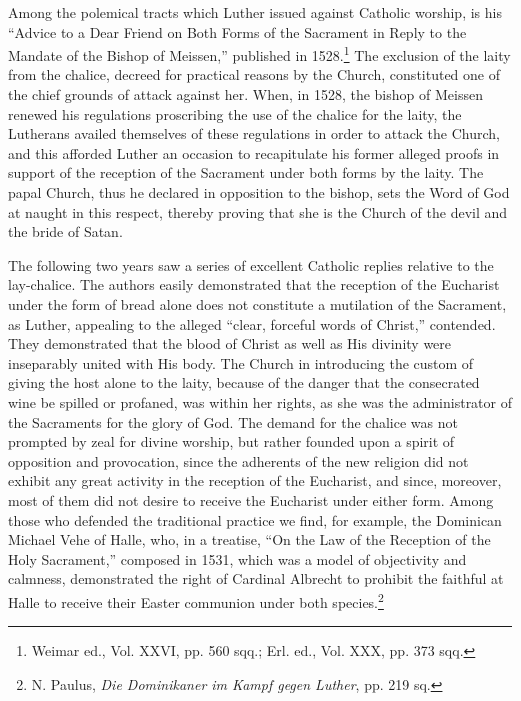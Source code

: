 Among the polemical tracts which Luther issued against Catholic
worship, is his “Advice to a Dear Friend on Both Forms of the Sacrament
in Reply to the Mandate of the Bishop of Meissen,” published in
1528.\footnote{Weimar ed., Vol. XXVI, pp. 560 sqq.; Erl. ed., Vol. XXX, pp. 373 sqq.}
The exclusion of the laity from the chalice, decreed for practical
reasons by the Church, constituted one of the chief grounds of
attack against her. When, in 1528, the bishop of Meissen renewed his
regulations proscribing the use of the chalice for the laity, the Lutherans
availed themselves of these regulations in order to attack the
Church, and this afforded Luther an occasion to recapitulate his former
alleged proofs in support of the reception of the Sacrament under
both forms by the laity. The papal Church, thus he declared in opposition
to the bishop, sets the Word of God at naught in this respect,
thereby proving that she is the Church of the devil and the bride of
Satan.

The following two years saw a series of excellent Catholic replies
relative to the lay-chalice. The authors easily demonstrated that the
reception of the Eucharist under the form of bread alone does not
constitute a mutilation of the Sacrament, as Luther, appealing to the
alleged “clear, forceful words of Christ,” contended. They demonstrated
that the blood of Christ as well as His divinity were inseparably
united with His body. The Church in introducing the custom of
giving the host alone to the laity, because of the danger that the consecrated
wine be spilled or profaned, was within her rights, as she was
the administrator of the Sacraments for the glory of God. The demand for
the chalice was not prompted by zeal for divine worship,
but rather founded upon a spirit of opposition and provocation, since
the adherents of the new religion did not exhibit any great activity in
the reception of the Eucharist, and since, moreover, most of them did
not desire to receive the Eucharist under either form. Among those
who defended the traditional practice we find, for example, the Dominican
Michael Vehe of Halle, who, in a treatise, “On the Law of the
Reception of the Holy Sacrament,” composed in 1531, which was a
model of objectivity and calmness, demonstrated the right of Cardinal
Albrecht to prohibit the faithful at Halle to receive their Easter
communion under both species.\footnote{N. Paulus, \textit{Die Dominikaner im Kampf gegen Luther}, pp. 219 sq.}


